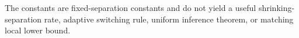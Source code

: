 The constants are fixed-separation constants and do not yield a useful shrinking-separation rate, adaptive switching rule, uniform inference theorem, or matching local lower bound.